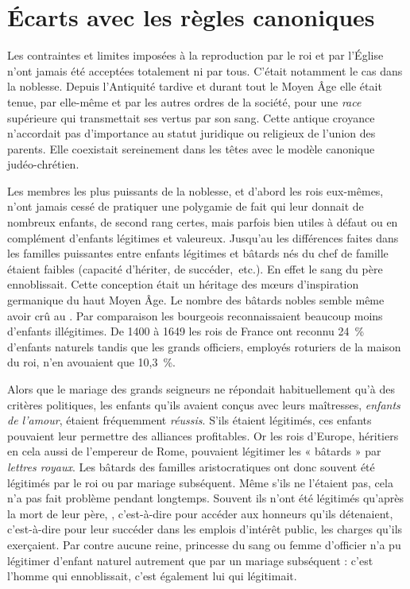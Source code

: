  \section{Écarts avec les règles canoniques}

 Les contraintes et limites imposées à la reproduction par le roi et par l'Église n'ont jamais été acceptées totalement ni par tous. C'était notamment le cas dans la noblesse. Depuis l'Antiquité tardive et durant tout le Moyen Âge elle était tenue, par elle-même et par les autres ordres de la société, pour une \emph{race} supérieure qui transmettait ses vertus par son sang. Cette antique croyance n'accordait pas d'importance au statut juridique ou religieux de l'union des parents. Elle coexistait sereinement dans les têtes avec le modèle canonique judéo-chrétien. 

 Les membres les plus puissants de la noblesse, et d'abord les rois eux-mêmes, n'ont jamais cessé de pratiquer une polygamie de fait qui leur donnait de nombreux enfants, de second rang certes, mais parfois bien utiles à défaut ou en complément d'enfants légitimes et valeureux. Jusqu'au  les différences faites dans les familles puissantes entre enfants légitimes et bâtards nés du chef de famille étaient faibles (capacité d'hériter, de succéder,~etc.). En effet le sang du père ennoblissait. Cette conception était un héritage des mœurs d'inspiration germanique du haut Moyen Âge. Le nombre des bâtards nobles semble même avoir crû au . Par comparaison les bourgeois reconnaissaient beaucoup moins d'enfants illégitimes. De 1400 à 1649 les rois de France ont reconnu 24~\% d'enfants naturels tandis que les grands officiers, employés roturiers de la maison du roi, n'en avouaient que 10,3~\%. 

 Alors que le mariage des grands seigneurs ne répondait habituellement qu'à des critères politiques, les enfants qu'ils avaient conçus avec leurs maîtresses, \emph{enfants de l'amour}, étaient fréquemment \emph{réussis}. S'ils étaient légitimés, ces enfants pouvaient leur permettre des alliances profitables. Or les rois d'Europe, héritiers en cela aussi de l'empereur de Rome, pouvaient légitimer les « bâtards » par \emph{lettres royaux}. Les bâtards des familles aristocratiques ont donc souvent été légitimés par le roi ou par mariage subséquent. Même s'ils ne l'étaient pas, cela n'a pas fait problème pendant longtemps. Souvent ils n'ont été légitimés qu'après la mort de leur père, , c'est-à-dire pour accéder aux honneurs qu'ils détenaient, c'est-à-dire pour leur succéder dans les emplois d'intérêt public, les charges qu'ils exerçaient. Par contre aucune reine, princesse du sang ou femme d'officier n'a pu légitimer d'enfant naturel autrement que par un mariage subséquent : c'est l'homme qui ennoblissait, c'est également lui qui légitimait. 

